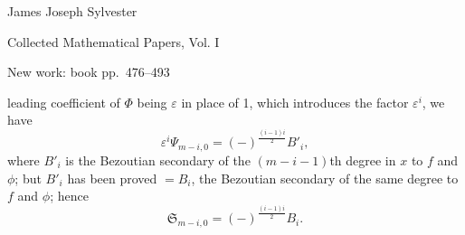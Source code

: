 \documentclass[11pt]{article}
\newcommand{\sourcepage}[1]{\marginpar{\scriptsize p.~#1}}
\begin{document}
\begin{center}
{\Large James Joseph Sylvester}\par\vspace{0.25em}
{\large Collected Mathematical Papers, Vol. I}\par\vspace{0.25em}
{\normalsize New work: book pp.~476--493}\par
\end{center}
\thispagestyle{empty}
\vspace{0.75em}
\providecommand{\sbrk}[2]{\left[\begin{array}{c}#1\\#2\end{array}\right]}
\providecommand{\sbrkt}[2]{\left[\begin{array}{c}\scriptstyle #1\\[-0.2em]\scriptstyle #2\end{array}\right]}
\providecommand{\Syz}{\mathfrak{S}}

\sourcepage{476}
leading coefficient of $\Phi$ being $\varepsilon$ in place of 1, which introduces the factor $\varepsilon^i$, we have
\[
\varepsilon^i\Psi_{m-i,0}=(-)^{\frac{(i-1)i}{2}}B'_i,
\]
where $B'_i$ is the Bezoutian secondary of the $(m-i-1)$th degree in $x$ to $f$ and $\phi$; but $B'_i$ has been proved $=B_i$, the Bezoutian secondary of the same degree to $f$ and $\phi$; hence
\[
\Syz_{m-i,0}=(-)^{\frac{(i-1)i}{2}}B_i.
\]
\end{document}
